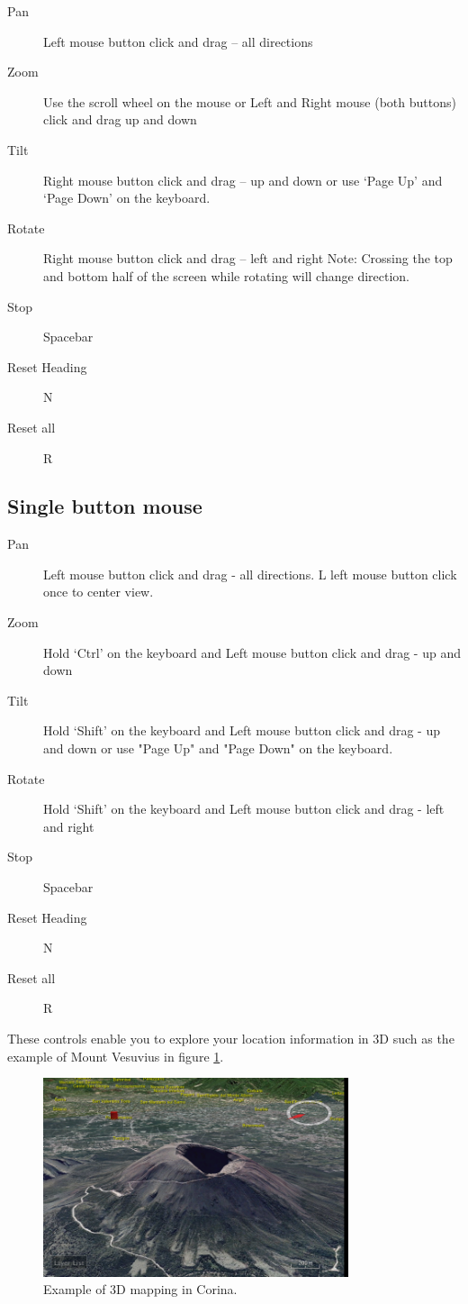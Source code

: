 \begin{description}
      \item[Pan] Left mouse button click and drag -- all directions
      \item[Zoom] Use the scroll wheel on the mouse or Left and Right mouse (both buttons) click and drag up and down
      \item[Tilt] Right mouse button click and drag -- up and down or use `Page Up' and `Page Down' on the keyboard.
      \item[Rotate] Right mouse button click and drag -- left and right Note: Crossing the top and bottom half of the screen while rotating will change direction.
      \item[Stop] Spacebar
      \item[Reset Heading] N
      \item[Reset all] R 
\end{description}


\subsection{Single button mouse}
\begin{description}
     \item[Pan] Left mouse button click and drag - all directions. L left mouse button click once to center view.
     \item[Zoom] Hold `Ctrl' on the keyboard and Left mouse button click and drag - up and down
     \item[Tilt] Hold `Shift' on the keyboard and Left mouse button click and drag - up and down or use "Page Up" and "Page Down" on the keyboard.
     \item[Rotate] Hold `Shift' on the keyboard and Left mouse button click and drag - left and right
     \item[Stop] Spacebar
     \item[Reset Heading] N
     \item[Reset all] R 
\end{description}


These controls enable you to explore your location information in 3D such as the example of Mount Vesuvius in figure \ref{fig:3dmap}.

\begin{figure}[hbtp]
  \centering
    \includegraphics[width=0.8\textwidth]{Images/3dmapexample.png}
  \caption{Example of 3D mapping in Corina.}
  \label{fig:3dmap}
\end{figure}

